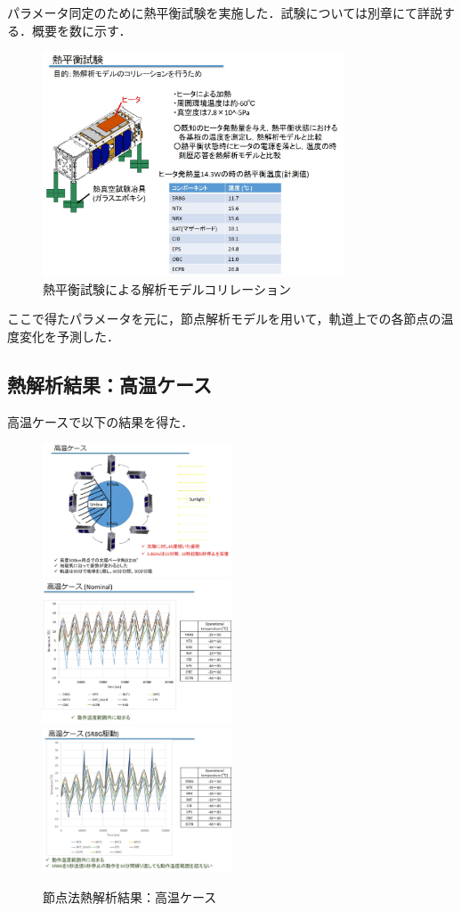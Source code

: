 パラメータ同定のために熱平衡試験を実施した．試験については別章にて詳説する．概要を数に示す．
\begin{figure}[H]
	\centering
	\includegraphics[width=0.8\textwidth]{03/fig/3-7-2.jpg}
	\caption{熱平衡試験による解析モデルコリレーション}
	\label{fig3-7-2}
\end{figure}
ここで得たパラメータを元に，節点解析モデルを用いて，軌道上での各節点の温度変化を予測した．

\subsection{熱解析結果：高温ケース}
高温ケースで以下の結果を得た．
\begin{figure}[H]
	\centering
	\includegraphics[width=0.5\textwidth]{03/fig/3-7-3.jpg}
	\includegraphics[width=0.5\textwidth]{03/fig/3-7-4.jpg}
	\includegraphics[width=0.5\textwidth]{03/fig/3-7-5.jpg}
	\caption{節点法熱解析結果：高温ケース}
	\label{fig3-7-3}
\end{figure}


